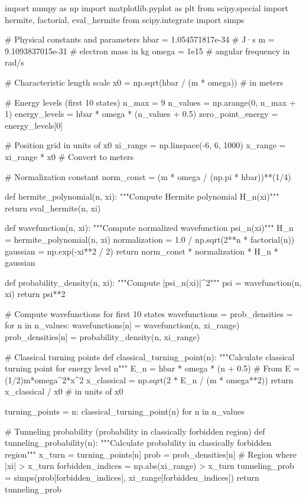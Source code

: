 \documentclass[a4paper, 11pt]{article}
\begin{document}
\begin{pycode}
import numpy as np
import matplotlib.pyplot as plt
from scipy.special import hermite, factorial, eval_hermite
from scipy.integrate import simps

# Physical constants and parameters
hbar = 1.054571817e-34  # J·s
m = 9.1093837015e-31    # electron mass in kg
omega = 1e15            # angular frequency in rad/s

# Characteristic length scale
x0 = np.sqrt(hbar / (m * omega))  # in meters

# Energy levels (first 10 states)
n_max = 9
n_values = np.arange(0, n_max + 1)
energy_levels = hbar * omega * (n_values + 0.5)
zero_point_energy = energy_levels[0]

# Position grid in units of x0
xi_range = np.linspace(-6, 6, 1000)
x_range = xi_range * x0  # Convert to meters

# Normalization constant
norm_const = (m * omega / (np.pi * hbar))**(1/4)

def hermite_polynomial(n, xi):
    """Compute Hermite polynomial H_n(xi)"""
    return eval_hermite(n, xi)

def wavefunction(n, xi):
    """Compute normalized wavefunction psi_n(xi)"""
    H_n = hermite_polynomial(n, xi)
    normalization = 1.0 / np.sqrt(2**n * factorial(n))
    gaussian = np.exp(-xi**2 / 2)
    return norm_const * normalization * H_n * gaussian

def probability_density(n, xi):
    """Compute |psi_n(xi)|^2"""
    psi = wavefunction(n, xi)
    return psi**2

# Compute wavefunctions for first 10 states
wavefunctions = {}
prob_densities = {}
for n in n_values:
    wavefunctions[n] = wavefunction(n, xi_range)
    prob_densities[n] = probability_density(n, xi_range)

# Classical turning points
def classical_turning_point(n):
    """Calculate classical turning point for energy level n"""
    E_n = hbar * omega * (n + 0.5)
    # From E = (1/2)m*omega^2*x^2
    x_classical = np.sqrt(2 * E_n / (m * omega**2))
    return x_classical / x0  # in units of x0

turning_points = {n: classical_turning_point(n) for n in n_values}

# Tunneling probability (probability in classically forbidden region)
def tunneling_probability(n):
    """Calculate probability in classically forbidden region"""
    x_turn = turning_points[n]
    prob = prob_densities[n]
    # Region where |xi| > x_turn
    forbidden_indices = np.abs(xi_range) > x_turn
    tunneling_prob = simps(prob[forbidden_indices], xi_range[forbidden_indices])
    return tunneling_prob


\end{pycode}
\end{document}
